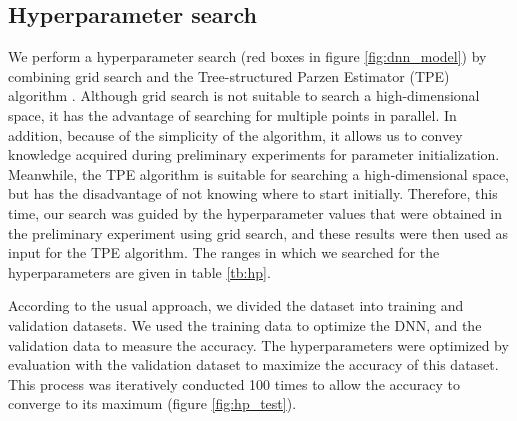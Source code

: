 \documentclass[useamsfonts]{pasj01}
\begin{document}
\subsection{Hyperparameter search}\label{hyperparametersearch}
We perform a hyperparameter search (red boxes in figure \ref{fig:dnn_model}) by combining grid search and the Tree-structured Parzen Estimator (TPE) algorithm \citep{pmlr-v28-bergstra13}.
Although grid search is not suitable to search a high-dimensional space, it has the advantage of searching for multiple points in parallel.
In addition, because of the simplicity of the algorithm, it allows us to convey knowledge acquired during preliminary experiments for parameter initialization.
Meanwhile, the TPE algorithm is suitable for searching a high-dimensional space, but has the disadvantage of not knowing where to start initially.
Therefore, this time, our search was guided by the hyperparameter values that were obtained in the preliminary experiment using grid search, and these results were then used as input for the TPE algorithm.  
The ranges in which we searched for the hyperparameters are given in table \ref{tb:hp}.

According to the usual approach, we divided the dataset into training and validation datasets.
We used the training data to optimize the DNN, and the validation data to measure the accuracy.
The hyperparameters were optimized by evaluation with the validation dataset to maximize the accuracy of this dataset.
This process was iteratively conducted 100 times to allow the accuracy to converge to its maximum (figure \ref{fig:hp_test}).

%
\begin{table}[htbp]
  \label{tb:hp}
\end{table}
\end{document}
